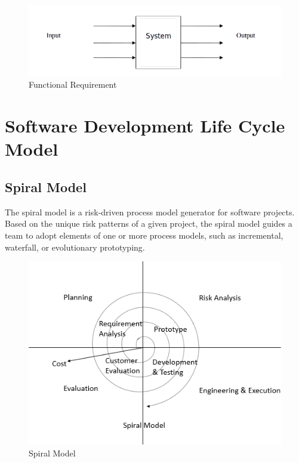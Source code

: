 \begin{figure}[ht]
\begin{center}
\includegraphics[scale=0.5]{images/LATEXREP001.png}
\end{center}
\caption{Functional Requirement}
\label{Functional Requirement}
\end{figure}



\section{Software Development Life Cycle Model}
\subsection{Spiral Model}
The spiral model is a risk-driven process model generator for software projects. Based on the
unique risk patterns of a given project, the spiral model guides a team to adopt elements of one
or more process models, such as incremental, waterfall, or evolutionary prototyping.

\begin{figure}[ht]
\begin{center}
\includegraphics[scale=0.5]{images/spiralmodel.png}
\end{center}
\caption{Spiral Model}
\label{Spiral Model}
\end{figure}

